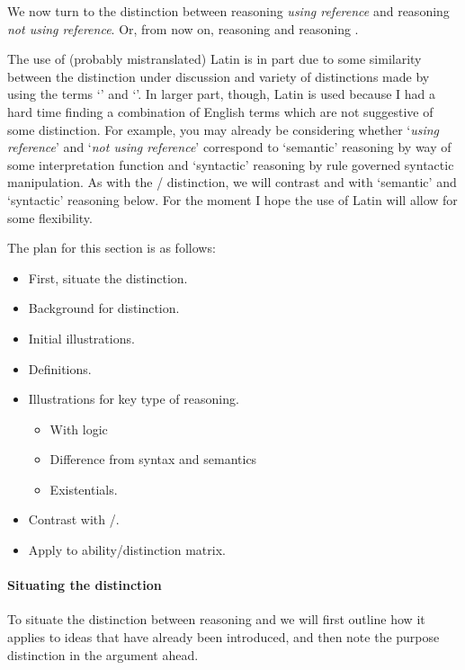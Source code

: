 \begin{note}
  We now turn to the distinction between reasoning \emph{using reference} and reasoning \emph{not using reference}.
  Or, from now on, reasoning \ur{} and reasoning \nr{}.

  The use of (probably mistranslated) Latin is in part due to some similarity between the distinction under discussion and variety of distinctions made by using the terms `\dd{}' and `\dr{}'.
  In larger part, though, Latin is used because I had a hard time finding a combination of English terms which are not suggestive of some distinction.
  For example, you may already be considering whether `\emph{using reference}' and `\emph{not using reference}' correspond to `semantic' reasoning by way of some interpretation function and `syntactic' reasoning by rule governed syntactic manipulation.
  As with the \dd{}/\dr{} distinction, we will contrast \ur{} and \nr{} with `semantic' and `syntactic' reasoning below.
  For the moment I hope the use of Latin will allow for some flexibility.
\end{note}

\begin{note}[Plan]
  The plan for this section is as follows:
  \begin{itemize}
  \item First, situate the distinction.
  \item Background for distinction.
  \item Initial illustrations.
  \item Definitions.
  \item Illustrations for key type of reasoning.
    \begin{itemize}
    \item With logic
    \item Difference from syntax and semantics
    \item Existentials.
    \end{itemize}
  \item Contrast with \dd{}/\dr{}.
  \item Apply to ability/distinction matrix.
  \end{itemize}
\end{note}

\paragraph*{Situating the distinction}

\begin{note}
  To situate the distinction between reasoning \ur{} and \nr{} we will first outline how it applies to ideas that have already been introduced, and then note the purpose distinction in the argument ahead.
\end{note}

